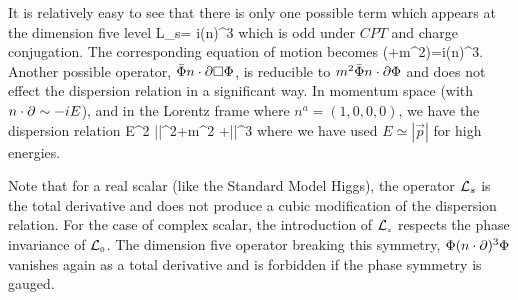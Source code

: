 It is relatively easy to see that there is only one possible term
which appears at the dimension five level
%
\be \label{nexts}
{\cal L}_s=%
i{\kappa\over\mpl}\Phib(n\cdot\prt)^3\Phi
\ee
%
which is odd under $CPT$ and charge conjugation. The
corresponding equation of motion becomes
%
\be\label{neweoms}
(\Box+m^2)\Phi=i{\kappa\over\mpl}(n\cdot\prt)^3\Phi.
\ee
%
Another possible operator, $\bar{\Phi} n\cdot\partial\Box\Phi$, is
reducible to $m^2 \bar{\Phi} n\cdot\partial\Phi$ and does not effect the
dispersion relation in a significant way. In momentum space (with
$n\cdot\partial\sim -iE$), and in the Lorentz frame where $n^a =
(1,0,0,0)$, we have the dispersion relation
%
\be E^2
\simeq||^2+m^2 +{\kappa\over\mpl}||^3
\label{newdisps} \ee
%
where we have used $E\simeq|\vec{p}|$ for high energies.

Note that for a real scalar (like the Standard Model Higgs), the
operator ${\cal L}_s$ is the total derivative and does not produce
a cubic modification of the dispersion relation. For the case of
complex scalar, the introduction of ${\cal L}_{\scriptscriptstyle s}$ respects the phase
invariance of ${\cal L}_{\scriptscriptstyle 0}$. The dimension five operator  breaking this
symmetry, \eg $\Phi(n\cdot\partial)^3\Phi$ vanishes again as a total
derivative and is forbidden if the phase symmetry is gauged.


